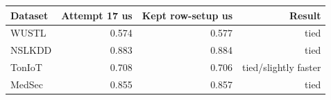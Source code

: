 \begin{tabular}{lrrr}
\toprule
Dataset & Attempt 17 us & Kept row-setup us & Result \\
\midrule
WUSTL & 0.574 & 0.577 & tied \\
NSLKDD & 0.883 & 0.884 & tied \\
TonIoT & 0.708 & 0.706 & tied/slightly faster \\
MedSec & 0.855 & 0.857 & tied \\
\bottomrule
\end{tabular}
